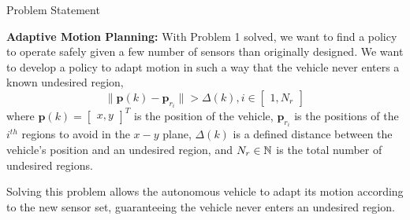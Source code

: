 \begin{section}{Problem Statement}
\begin{problem} \label{problem2} {\textbf{Adaptive Motion Planning:}}
With Problem 1 solved, we want to find a policy to operate safely given a few number of sensors than originally designed. We want to develop a policy to adapt motion in such a way that the vehicle never enters a known undesired region,
	\begin{equation}
		\lVert {\bm{p}(k)-\bm{p}_{r_i}} \rVert >\Delta(k),  i \in \begin{bmatrix} 1,N_r \end{bmatrix}
	\end{equation}
where $\bm{p}(k)={\begin{bmatrix} x,y \end{bmatrix}}^T$ is the position of the vehicle, $\bm{p}_{r_i}$ is the positions of the ${i}^{th}$ regions to avoid in the $x-y$ plane, $\Delta(k)$ is a defined distance between the vehicle's position and an undesired region, and $N_r \in \mathbb{N}$ is the total number of undesired regions. 

\end{problem}

Solving this problem allows the autonomous vehicle to adapt its motion according to the new sensor set, guaranteeing the vehicle never enters an undesired region.

\end{section}
